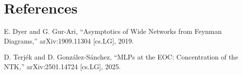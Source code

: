 \documentclass[11pt,a4paper]{article}
\theoremstyle{definition}
\begin{document}
\newpage




\appendix
\section{References}

E. Dyer and G. Gur-Ari,
``Asymptotics of Wide Networks from Feynman Diagrams,''
arXiv:1909.11304 [cs.LG], 2019.

D. Terjék and D. González-Sánchez,
``MLPs at the EOC: Concentration of the NTK,''
arXiv:2501.14724 [cs.LG], 2025.
\end{document}

